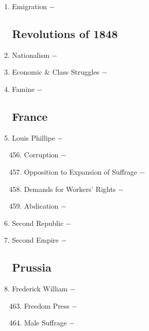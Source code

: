 \documentclass[12pt]{article}
\begin{document}
\begin{enumerate}
\item Emigration $-$

\subsection{Revolutions of 1848}

\item Nationalism $-$ 

\item Economic \& Class Struggles $-$

\item Famine $-$

\subsection{France}

\item Louis Phillipe $-$ 

\begin{enumerate}[label=\arabic{*}.]
\setcounter{enumii}{455}

\item Corruption $-$ 

\item Opposition to Expansion of Suffrage $-$ 

\item Demands for Workers' Rights $-$ 

\item Abdication $-$

\end{enumerate}
\setcounter{enumi}{459}

\item Second Republic $-$ 

\item Second Empire $-$ 

\subsection{Prussia}

\item Frederick William $-$ 

\begin{enumerate}[label=\arabic{*}.]
\setcounter{enumii}{462}

\item Freedom Press $-$ 

\item Male Suffrage $-$ 


\end{enumerate}
\end{enumerate}
\end{document}

